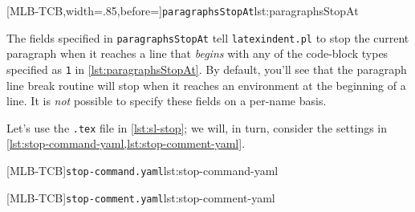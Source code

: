 	[MLB-TCB,width=.85\linewidth,before=\centering]{\texttt{paragraphsStopAt}}{lst:paragraphsStopAt}

	The fields specified in \texttt{paragraphsStopAt} tell \texttt{latexindent.pl} to stop the current paragraph when it reaches a line that \emph{begins} with any of the code-block types specified as \texttt{1} in \cref{lst:paragraphsStopAt}.
	By default, you'll see that the paragraph line break routine will stop when it reaches an environment at the beginning of a line.
	It is \emph{not} possible to specify these fields on a per-name basis.

	Let's use the \texttt{.tex} file in \cref{lst:sl-stop}; we will, in turn, consider the settings in \cref{lst:stop-command-yaml,lst:stop-comment-yaml}.

	\begin{minipage}{.45\linewidth}
	\end{minipage}
	\hfill
	\begin{minipage}{.49\linewidth}
		[MLB-TCB]{\texttt{stop-command.yaml}}{lst:stop-command-yaml}

		[MLB-TCB]{\texttt{stop-comment.yaml}}{lst:stop-comment-yaml}
	\end{minipage}

